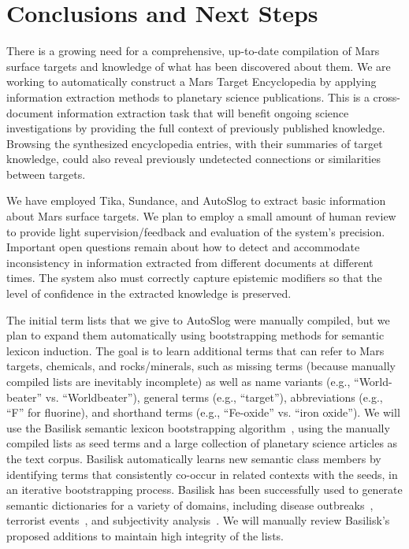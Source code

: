 \documentclass[letterpaper]{article}
\begin{document}
\section{Conclusions and Next Steps}

There is a growing need for a comprehensive, up-to-date compilation of
Mars surface targets and knowledge of what has been discovered about
them.  We are working to automatically construct a Mars Target
Encyclopedia by applying information extraction methods to planetary
science publications.  This is a cross-document information extraction
task that will benefit ongoing science investigations by providing the
full context of previously published knowledge.  Browsing the
synthesized encyclopedia entries, with their summaries of target
knowledge, could also reveal previously undetected connections or
similarities between targets. 


We have employed Tika, Sundance, and AutoSlog to extract basic
information about Mars surface targets.  We plan to employ a small
amount of human review to provide light supervision/feedback and
evaluation of the system's precision.
%
Important open questions remain about how to detect and accommodate
inconsistency in information extracted from different documents at
different times.  The system also must correctly capture epistemic
modifiers so that the level of confidence in the extracted knowledge
is preserved.



The initial term lists that we give to AutoSlog were manually
compiled, but we plan to expand them automatically using bootstrapping
methods for semantic lexicon induction. The goal is to learn
additional terms that can refer to Mars targets, chemicals, and
rocks/minerals, such as missing terms (because manually compiled lists
are inevitably incomplete) as well as name variants (e.g.,
``World-beater'' vs. ``Worldbeater''), general terms (e.g.,
``target''), abbreviations (e.g., ``F'' for fluorine), and shorthand
terms (e.g., ``Fe-oxide'' vs. ``iron oxide'').  We will use the
Basilisk semantic lexicon bootstrapping
algorithm~\cite{thelen:basilisk02}, using the manually compiled lists
as seed terms and a large collection of planetary science articles as
the text corpus. Basilisk automatically learns new semantic class
members by identifying terms that consistently co-occur in related
contexts with the seeds, in an iterative bootstrapping process.
Basilisk has been successfully used to generate semantic dictionaries
for a variety of domains, including disease
outbreaks~\cite{phillips:role07,qadir:ens12}, terrorist
events~\cite{thelen:basilisk02}, and subjectivity
analysis~\cite{riloff:subj03}. We will manually review Basilisk's
proposed additions to maintain high integrity of the lists.
\end{document}
